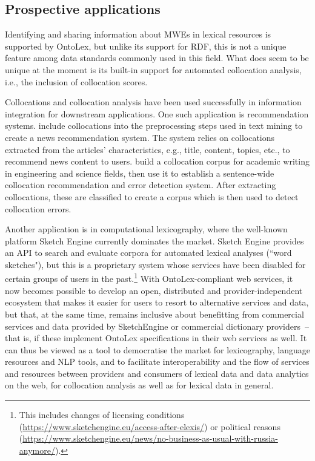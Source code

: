 \documentclass[output=paper,colorlinks,citecolor=brown]{langscibook}
\begin{document}
\subsection{Prospective applications}
\label{sec-applications}



Identifying and sharing information about MWEs in lexical resources is supported by OntoLex, but unlike its support for RDF, this is not a unique feature among data standards commonly used in this field.
What does seem to be unique at the moment is its built-in support for automated collocation analysis, i.e., the inclusion of collocation scores.

Collocations and collocation analysis have been used successfully in information integration for downstream applications.
One such application is recommendation systems. \citet{Kompan2011} include collocations into the preprocessing steps used in text mining to create a news recommendation system.
The system relies on collocations extracted from the articles' characteristics, e.g., title, content, topics, etc., to recommend news content to users.
%
\citet{Chu2018} build a collocation corpus for academic writing in engineering and science fields, then use it to establish a sentence-wide collocation recommendation and error detection system.
After
extracting collocations, these
are classified to create  %
a corpus which is then used to detect collocation errors.

Another application is %
in computational lexicography, where the well-known platform Sketch Engine currently dominates the market. Sketch Engine provides an API to search and evaluate corpora for automated lexical analyses (``word sket\-ches"), but this is a proprietary system whose services have been disabled for certain groups of users in the past.\footnote{%
This includes changes of licensing conditions (\url{https://www.sketchengine.eu/access-after-elexis/}) or political reasons (\url{https://www.sketchengine.eu/news/no-business-as-usual-with-russia-anymore/}).
}
With OntoLex-compliant web services, it now becomes possible to develop an open, distributed and provider-independent ecosystem that makes it easier for users to resort to alternative services and data, but that, at the same time, remains inclusive about benefitting from commercial services and data provided by Sketch\-En\-gi\-ne or commercial dictionary providers~-- that is, if these implement OntoLex specifications in their web services as well. It can thus be viewed as a tool to democratise the market for lexicography, language resources and NLP tools, and to facilitate interoperability and the flow of services and resources between providers and consumers of lexical data and data analytics on the web, for collocation analysis as well as for lexical data in general.
\end{document}
